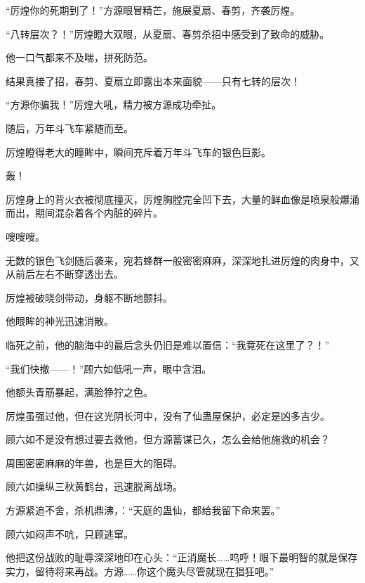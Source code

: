 \begin{this_body}
“厉煌你的死期到了！”方源眼冒精芒，施展夏扇、春剪，齐袭厉煌。

“八转层次？！”厉煌瞪大双眼，从夏扇、春剪杀招中感受到了致命的威胁。

他一口气都来不及喘，拼死防范。

结果真接了招，春剪、夏扇立即露出本来面貌——只有七转的层次！

“方源你骗我！”厉煌大吼，精力被方源成功牵扯。

随后，万年斗飞车紧随而至。

厉煌瞪得老大的瞳眸中，瞬间充斥着万年斗飞车的银色巨影。

轰！

厉煌身上的背火衣被彻底撞灭，厉煌胸膛完全凹下去，大量的鲜血像是喷泉般爆涌而出，期间混杂着各个内脏的碎片。

嗖嗖嗖。

无数的银色飞剑随后袭来，宛若蜂群一般密密麻麻，深深地扎进厉煌的肉身中，又从前后左右不断穿透出去。

厉煌被破晓剑带动，身躯不断地颤抖。

他眼眸的神光迅速消散。

临死之前，他的脑海中的最后念头仍旧是难以置信：“我竟死在这里了？！”

“我们快撤——！”顾六如低吼一声，眼中含泪。

他额头青筋暴起，满脸狰狞之色。

厉煌虽强过他，但在这光阴长河中，没有了仙蛊屋保护，必定是凶多吉少。

顾六如不是没有想过要去救他，但方源蓄谋已久，怎么会给他施救的机会？

周围密密麻麻的年兽，也是巨大的阻碍。

顾六如操纵三秋黄鹤台，迅速脱离战场。

方源紧追不舍，杀机鼎沸，：“天庭的蛊仙，都给我留下命来罢。”

顾六如闷声不吭，只顾逃窜。

他把这份战败的耻辱深深地印在心头：“正消魔长……呜呼！眼下最明智的就是保存实力，留待将来再战。方源……你这个魔头尽管就现在猖狂吧。”

\end{this_body}

